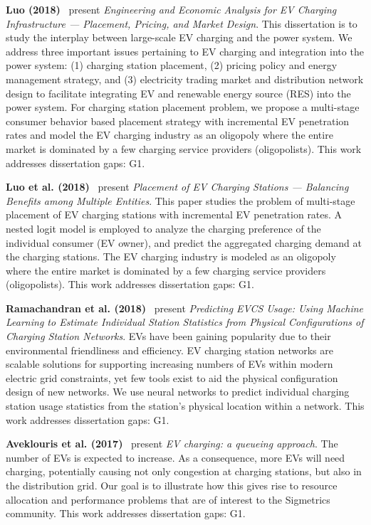 \documentclass[letterpaper, 12pt, oneside, doublespacing]{Thesis}
\begin{document}
\noindent \textbf{Luo (2018)}~\cite{a_consumer_2018} present \textit{Engineering and Economic Analysis for EV Charging Infrastructure --- Placement, Pricing, and Market Design}. This dissertation is to study the interplay between large-scale EV charging and the power system. We address three important issues pertaining to EV charging and integration into the power system: (1) charging station placement, (2) pricing policy and energy management strategy, and (3) electricity trading market and distribution network design to facilitate integrating EV and renewable energy source (RES) into the power system. For charging station placement problem, we propose a multi-stage consumer behavior based placement strategy with incremental EV penetration rates and model the EV charging industry as an oligopoly where the entire market is dominated by a few charging service providers (oligopolists). This work addresses dissertation gaps: G1.



\noindent \textbf{Luo et al. (2018)}~\cite{a_consumer_2018} present \textit{Placement of EV Charging Stations --- Balancing Benefits among Multiple Entities}. This paper studies the problem of multi-stage placement of EV charging stations with incremental EV penetration rates. A nested logit model is employed to analyze the charging preference of the individual consumer (EV owner), and predict the aggregated charging demand at the charging stations. The EV charging industry is modeled as an oligopoly where the entire market is dominated by a few charging service providers (oligopolists). This work addresses dissertation gaps: G1.



\noindent \textbf{Ramachandran et al. (2018)}~\cite{predicting_electric_2018} present \textit{Predicting EVCS Usage: Using Machine Learning to Estimate Individual Station Statistics from Physical Configurations of Charging Station Networks}. EVs have been gaining popularity due to their environmental friendliness and efficiency. EV charging station networks are scalable solutions for supporting increasing numbers of EVs within modern electric grid constraints, yet few tools exist to aid the physical configuration design of new networks. We use neural networks to predict individual charging station usage statistics from the station's physical location within a network. This work addresses dissertation gaps: G1.



\noindent \textbf{Aveklouris et al. (2017)}~\cite{electric_vehicle_2017} present \textit{EV charging: a queueing approach}. The number of EVs is expected to increase. As a consequence, more EVs will need charging, potentially causing not only congestion at charging stations, but also in the distribution grid. Our goal is to illustrate how this gives rise to resource allocation and performance problems that are of interest to the Sigmetrics community. This work addresses dissertation gaps: G1.
\end{document}
